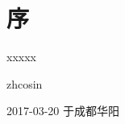 
\chapter*{序}
\thispagestyle{empty}

xxxxx

\vspace{1.5cm}

\hfill zhcosin \hspace{5em}

\hfill 2017-03-20 于成都华阳 \hspace{1.5em}



